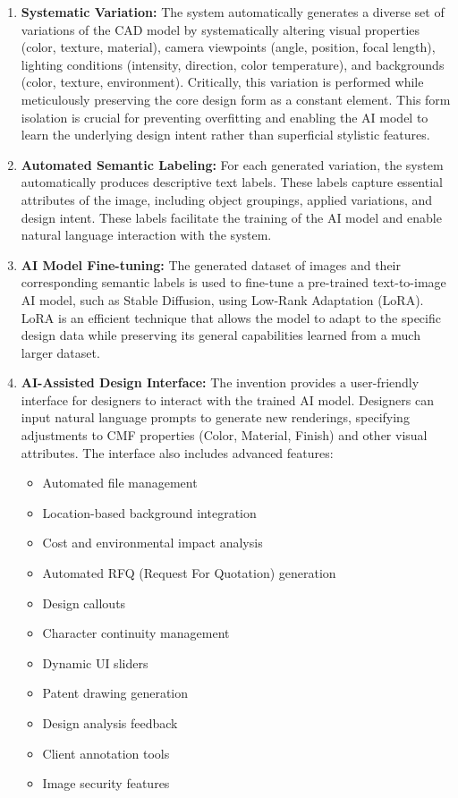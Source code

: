 \documentclass[12pt]{report}
\begin{document}
\begin{enumerate}
    \item \textbf{Systematic Variation:} The system automatically generates a diverse set of variations of the CAD model by systematically altering visual properties (color, texture, material), camera viewpoints (angle, position, focal length), lighting conditions (intensity, direction, color temperature), and backgrounds (color, texture, environment). Critically, this variation is performed while meticulously preserving the core design form as a constant element. This form isolation is crucial for preventing overfitting and enabling the AI model to learn the underlying design intent rather than superficial stylistic features.

    \item \textbf{Automated Semantic Labeling:} For each generated variation, the system automatically produces descriptive text labels. These labels capture essential attributes of the image, including object groupings, applied variations, and design intent. These labels facilitate the training of the AI model and enable natural language interaction with the system. 

    \item \textbf{AI Model Fine-tuning:} The generated dataset of images and their corresponding semantic labels is used to fine-tune a pre-trained text-to-image AI model, such as Stable Diffusion, using Low-Rank Adaptation (LoRA). LoRA is an efficient technique that allows the model to adapt to the specific design data while preserving its general capabilities learned from a much larger dataset. 

    \item \textbf{AI-Assisted Design Interface:}  The invention provides a user-friendly interface for designers to interact with the trained AI model.  Designers can input natural language prompts to generate new renderings, specifying adjustments to CMF properties (Color, Material, Finish) and other visual attributes. The interface also includes advanced features:
        \begin{itemize}
            \item Automated file management
            \item Location-based background integration 
            \item Cost and environmental impact analysis 
            \item Automated RFQ (Request For Quotation) generation
            \item Design callouts
            \item Character continuity management
            \item Dynamic UI sliders
            \item Patent drawing generation
            \item Design analysis feedback
            \item Client annotation tools
            \item Image security features
        \end{itemize}
\end{enumerate}
\end{document}

